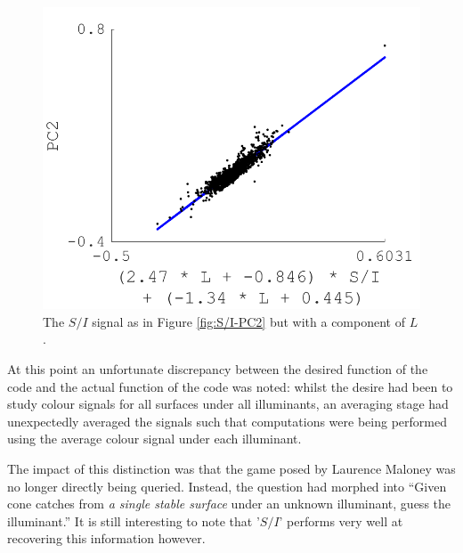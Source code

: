 \begin{figure}[htbp]
 \includegraphics[max width=\textwidth]{figs/comp/melcomp_3/24.png}
 \caption{The $S/I$ signal as in Figure \ref{fig:S/I-PC2} but with a component of $L$.}
 \label{fig:withPC1}
\end{figure} 

At this point an unfortunate discrepancy between the desired function of the code and the actual function of the code was noted: whilst the desire had been to study colour signals for all surfaces under all illuminants, an averaging stage had unexpectedly averaged the signals such that computations were being performed using the average colour signal under each illuminant. 

The impact of this distinction was that the game posed by Laurence Maloney was no longer directly being queried. Instead, the question had morphed into ``Given cone catches from \emph{a single stable surface} under an unknown illuminant, guess the illuminant.'' It is still interesting to note that '$S/I$' performs very well at recovering this information however.

